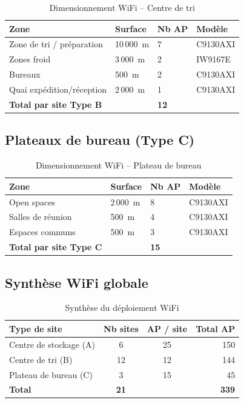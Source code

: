\documentclass[12pt,a4paper]{report}
\begin{document}
\begin{table}[H]
\centering
\begin{tabularx}{\textwidth}{L{4cm}C{2cm}C{2cm}L{4cm}}
\toprule
\textbf{Zone} & \textbf{Surface} & \textbf{Nb AP} & \textbf{Modèle} \\
\midrule
Zone de tri / préparation & 10\,000~m & 7 & C9130AXI \\
Zones froid & 3\,000~m & 2 & IW9167E \\
Bureaux & 500~m & 2 & C9130AXI \\
Quai expédition/réception & 2\,000~m & 1 & C9130AXI \\
\midrule
\textbf{Total par site Type B} & & \textbf{12} & \\
\bottomrule
\end{tabularx}
\caption{Dimensionnement WiFi -- Centre de tri}
\label{tab:wifi_typeB}
\end{table}

\subsection{Plateaux de bureau (Type C)}

\begin{table}[H]
\centering
\begin{tabularx}{\textwidth}{L{4cm}C{2cm}C{2cm}L{4cm}}
\toprule
\textbf{Zone} & \textbf{Surface} & \textbf{Nb AP} & \textbf{Modèle} \\
\midrule
Open spaces & 2\,000~m & 8 & C9130AXI \\
Salles de réunion & 500~m & 4 & C9130AXI \\
Espaces communs & 500~m & 3 & C9130AXI \\
\midrule
\textbf{Total par site Type C} & & \textbf{15} & \\
\bottomrule
\end{tabularx}
\caption{Dimensionnement WiFi -- Plateau de bureau}
\label{tab:wifi_typeC}
\end{table}

\subsection{Synthèse WiFi globale}

\begin{table}[H]
\centering
\begin{tabular}{lccr}
\toprule
\textbf{Type de site} & \textbf{Nb sites} & \textbf{AP / site} & \textbf{Total AP} \\
\midrule
Centre de stockage (A) & 6 & 25 & 150 \\
Centre de tri (B) & 12 & 12 & 144 \\
Plateau de bureau (C) & 3 & 15 & 45 \\
\midrule
\textbf{Total} & \textbf{21} & & \textbf{339} \\
\bottomrule
\end{tabular}
\caption{Synthèse du déploiement WiFi}
\label{tab:wifi_total}
\end{table}
\end{document}
